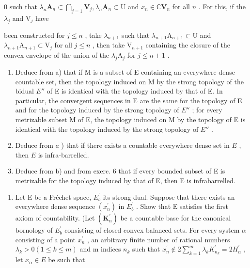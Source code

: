 0 such that \(\lambda_{n}\mathbf{A}_{n}\subset \bigcap_{j = 1}\mathbf{V}_{j},\lambda_{n}\mathbf{A}_{n}\subset \mathrm{U}\) and \(x_{n}\in \mathbb{C}\mathbf{V}_{n}\) for all \(n\) . For this, if the \(\lambda_{j}\) and \(\mathrm{V}_j\) have

been constructed for \(j \leqslant n\) , take \(\lambda_{n+1}\) such that \(\lambda_{n+1}\mathrm{A}_{n+1} \subset \mathrm{U}\) and \(\lambda_{n+1}\mathrm{A}_{n+1} \subset \mathrm{V}_j\) for all \(j \leqslant n\) , then take \(\mathrm{V}_{n+1}\) containing the closure of the convex envelope of the union of the \(\lambda_j\mathrm{A}_j\) for \(j \leqslant n + 1\) .

\begin{enumerate}
\def\labelenumi{\alph{enumi})}
\setcounter{enumi}{1}
\item
  Deduce from a) that if M is a subset of E containing an everywhere dense countable set, then the topology induced on M by the strong topology of the bidual \(E''\) of E is identical with the topology induced by that of E. In particular, the convergent sequences in E are the same for the topology of E and for the topology induced by the strong topology of \(E''\) ; for every metrizable subset M of E, the topology induced on M by the topology of E is identical with the topology induced by the strong topology of \(E''\) .
\item
  Deduce from \(a\) ) that if there exists a countable everywhere dense set in \(E\) , then \(E\) is infra-barrelled.
\item
  Deduce from b) and from exerc. 6 that if every bounded subset of E is metrizable for the topology induced by that of E, then E is infrabarrelled.
\end{enumerate}

\begin{enumerate}
\def\labelenumi{\arabic{enumi})}
\setcounter{enumi}{7}
\tightlist
\item
  Let E be a Fréchet space, \(E_{b}^{\prime}\) its strong dual. Suppose that there exists an everywhere dense sequence \((x_{n}^{\prime})\) in \(E_{b}^{\prime}\) . Show that E satisfies the first axiom of countability. (Let \((\mathbf{K}_{n}^{\prime})\) be a countable base for the canonical bornology of \(E_{b}^{\prime}\) consisting of closed convex balanced sets. For every system \(\alpha\) consisting of a point \(x_{n}^{\prime}\) , an arbitrary finite number of rational numbers \(\lambda_{k} > 0 (1 \leqslant k \leqslant m)\) and m indices \(n_{k}\) such that \(x_{n}^{\prime} \notin 2 \sum_{k=1}^{m} \lambda_{k} K_{n_{k}}^{\prime} = 2 H_{\alpha}^{\prime}\) , let \(x_{\alpha} \in E\) be such that
\end{enumerate}

